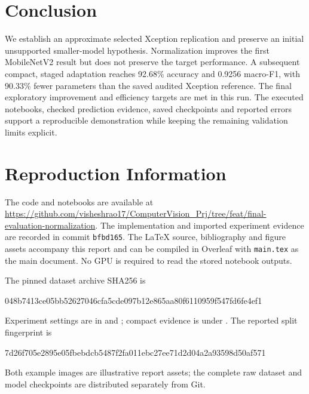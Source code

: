 \documentclass[11pt,a4paper]{article}
\begin{document}
\section{Conclusion}
We establish an approximate selected Xception replication and preserve an
initial unsupported smaller-model hypothesis. Normalization improves the first
MobileNetV2 result but does not preserve the target performance. A
subsequent compact, staged adaptation reaches 92.68\% accuracy and 0.9256
macro-F1, with 90.33\% fewer parameters than the saved audited Xception reference.
The final exploratory improvement and efficiency targets are met in this run.
The executed notebooks, checked prediction evidence, saved checkpoints and
reported errors support a reproducible demonstration while keeping the
remaining validation limits explicit.




\appendix
\section{Reproduction Information}
The code and notebooks are available at
\url{https://github.com/visheshrao17/ComputerVision_Prj/tree/feat/final-evaluation-normalization}.
The implementation and imported experiment evidence are recorded in commit
\texttt{bfbd165}. The LaTeX source, bibliography and figure assets accompany this
report and can be compiled in Overleaf with \texttt{main.tex} as the main document.
No GPU is required to read the stored notebook outputs.

The pinned dataset archive SHA256 is
\begin{center}\small\ttfamily
048b7413ce05bb52627046cfa5cde097b12e865aa80f6110959f547fd6fe4ef1
\end{center}
Experiment settings are in  and
; compact evidence is under
. The reported split fingerprint is
\begin{center}\small\ttfamily
7d26f705e2895e05fbebdcb5487f2fa011ebc27ee71d2d04a2a93598d50af571
\end{center}
Both example images are illustrative report assets; the complete
raw dataset and model checkpoints are distributed separately from Git.
\end{document}
